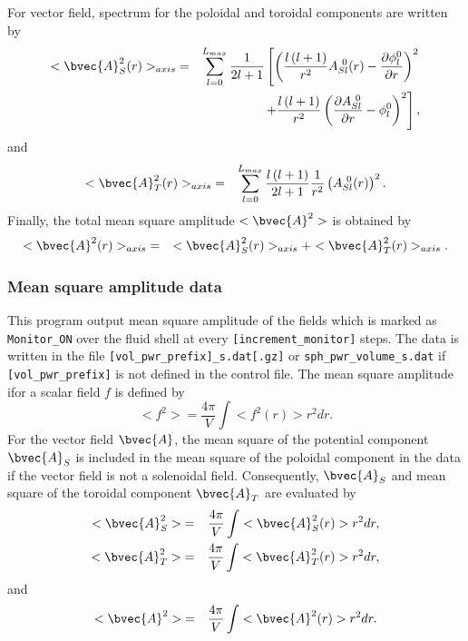 \begin{description}
%
For vector field, spectrum for the poloidal and toroidal components are written by 
%
\begin{eqnarray}
<\bvec{A}_{S}^{2}(r)>_{axis} &=&   \sum_{l=0}^{L_{max}} \frac{1}{2l + 1}
\left[  \left(\frac{l\left(l+1 \right) }{r^{2}} A_{Sl}^{\ 0}(r) - \frac{\partial \phi_{l}^{0}}{\partial r} \right)^{2} 
\right. \nonumber \\
& & \left. +  \frac{l \left( l+1 \right)}{r^{2}} \left( \frac{\partial A_{Sl}^{\ 0}}{\partial r} - \phi_{l}^{0} \right)^{2} \right],
\end{eqnarray}
%
and
\begin{eqnarray}
<\bvec{A}_{T}^{2}(r)>_{axis} &=&  \sum_{l=0}^{L_{max}} \frac{l \left( l+1 \right)}{2l + 1} \frac{1}{r^{2}} 
\left( A_{Sl}^{\ 0}(r) \right)^{2}.
\end{eqnarray}
Finally, the total mean square amplitude $<\bvec{A}^{2}> $ is obtained by
\begin{eqnarray}
<\bvec{A}^{2}(r)>_{axis} &=& <\bvec{A}_{S}^{2}(r)>_{axis}  + <\bvec{A}_{T}^{2}(r)>_{axis} .
\end{eqnarray}

\end{description}


\subsubsection{Mean square amplitude data}
\label{sec:mean_square}
This program output mean square amplitude of the fields which is marked as \verb|Monitor_ON| over the fluid shell at every \verb|[increment_monitor]| steps. The data is written in the file \verb|[vol_pwr_prefix]_s.dat[.gz]| or  \verb|sph_pwr_volume_s.dat| if \\
{\tt [vol\_pwr\_prefix]} is not defined in the control file. The mean square amplitude ifor a scalar field $f$ is defined by
%
\begin{equation}
<f^{2}> =   \frac{4\pi}{V} \int <f^{2}(r)> r^{2} dr.
\end{equation}
%
For the vector field $\bvec{A}$, the mean square of the potential component $\bvec{A}_{S}$ is included in the mean square of the poloidal component in the data if the vector field is not a solenoidal field. Consequently, $\bvec{A}_{S}$ and mean square of the toroidal component $\bvec{A}_{T}$ are evaluated by 
%
\begin{eqnarray}
<\bvec{A}_{S}^{2}> &=& \frac{4\pi}{V} \int <\bvec{A}_{S}^{2}(r)> r^{2} dr,
\nonumber \\
<\bvec{A}_{T}^{2}>  &=& \frac{4\pi}{V} \int <\bvec{A}_{T}^{2}(r)>  r^{2} dr,
\end{eqnarray}
% 
and
%
\begin{eqnarray}
<\bvec{A}^{2}> &=& \frac{4\pi}{V} \int <\bvec{A}^{2}(r)>  r^{2} dr.
\label{eq:vol_vec_msq}
\end{eqnarray}

